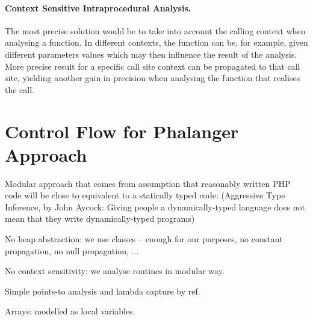         \paragraph{Context Sensitive Intraprocedural Analysis.}
        The most precise solution would be to take into account 
        the calling context when analysing a function. 
        In different contexts, the function can be, 
        for example, given different parameters values 
        which may then influence the result of the analysis. 
        More precise result for a specific call site context 
        can be propagated to that call site, 
        yielding another gain in precision when 
        analysing the function that realises the call.
        
        \paragraph*{}
    
    \section{Control Flow for Phalanger Approach}
        
        \begin{itemize*}
            \item Modular approach that comes from assumption that 
                reasonably written PHP code will be close to equivalent to 
                a statically typed code: (Aggressive Type Inference, by John Aycock: Giving people 
                a dynamically-typed language does not mean that they write dynamically-typed programs)
                \begin{itemize*}
                    \item No heap abstraction: we use classes -- enough for our purposes, no constant propagation, no null propagation, ...
                    \item No context sensitivity: we analyse routines in modular way.
                    \item Simple points-to analysis and lambda capture by ref.
                    \item Arrays: modelled as local variables.
                \end{itemize*}
        \end{itemize*}
        